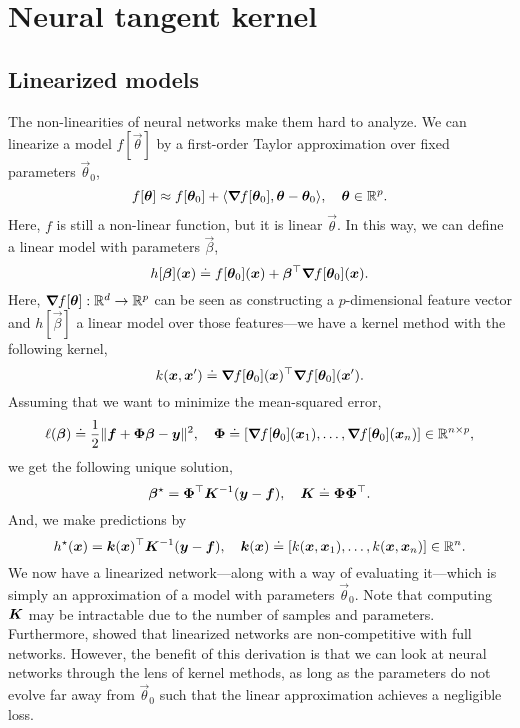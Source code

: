 \section{Neural tangent kernel}

\subsection{Linearized models}

The non-linearities of neural networks make them hard to analyze. We can linearize a model
$f[\vec{\theta}]$ by a first-order Taylor approximation over fixed parameters $\vec{\theta}_0$, \[
    f[\bm{\theta}] \approx f[\bm{\theta}_0] + \langle \bm{\nabla}_{\! } f[\bm{\theta}_0], \bm{\theta} - \bm{\theta}_0 \rangle, \quad \bm{\theta} \in \mathbb{R}^p.
\]
Here, $f$ is still a non-linear function, but it is linear \wrt $\vec{\theta}$. In this way, we can
define a linear model with parameters $\vec{\beta}$, \[
    h[\bm{\beta}](\bm{x}) \doteq f[\bm{\theta}_0](\bm{x}) + \bm{\beta}^\top \bm{\nabla}_{\! } f[\bm{\theta}_0](\bm{x}).
\]
Here, $\bm{\nabla}_{\! } f[\bm{\theta}]: \mathbb{R}^d \to \mathbb{R}^p$ can be seen as constructing a $p$-dimensional
feature vector and $h[\vec{\beta}]$ a linear model over those features---we have a kernel method
with the following kernel, \[
    k(\bm{x}, \bm{x}') \doteq \bm{\nabla}_{\! } f[\bm{\theta}_0](\bm{x})^\top \bm{\nabla}_{\! } f[\bm{\theta}_0](\bm{x}').
\]
Assuming that we want to minimize the mean-squared error, \[
    \ell(\bm{\beta}) \doteq \frac{1}{2} \| \bm{f} + \bm{\Phi} \bm{\beta} - \bm{y} \|^2, \quad \bm{\Phi} \doteq [\bm{\nabla}_{\! } f[\bm{\theta}_0](\bm{x}_1), \ldots, \bm{\nabla}_{\! } f[\bm{\theta}_0](\bm{x}_n)] \in \mathbb{R}^{n \times p},
\]
we get the following unique solution, \[
    \bm{\beta}^\star = \bm{\Phi}^\top \bm{K}^{-1} (\bm{y} - \bm{f}), \quad \bm{K} \doteq \bm{\Phi} \bm{\Phi}^\top.
\]
And, we make predictions by \[
    h^\star(\bm{x}) = \bm{k}(\bm{x})^\top \bm{K}^{-1} (\bm{y} - \bm{f}), \quad \bm{k}(\bm{x}) \doteq [k(\bm{x}, \bm{x}_1), \ldots, k(\bm{x}, \bm{x}_n)] \in \mathbb{R}^n.
\]
We now have a linearized network---along with a way of evaluating it---which is simply an
approximation of a model with parameters $\vec{\theta}_0$. Note that computing $\bm{K}$ may be
intractable due to the number of samples and parameters. Furthermore, \citet{lee2019wide} showed
that linearized networks are non-competitive with full networks. However, the benefit of this
derivation is that we can look at neural networks through the lens of kernel methods, as long as
the parameters do not evolve far away from $\vec{\theta}_0$ such that the linear approximation
achieves a negligible loss.

